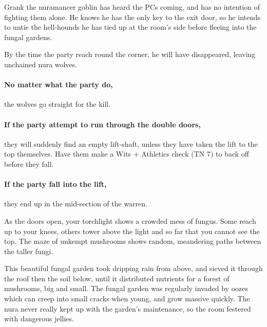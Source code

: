 \begin{multicols}{2}
Grank the nuramancer goblin has heard the PCs coming, and has no intention of fighting them alone.
He knows he has the only key to the exit door, so he intends to untie the hell-hounds he has tied up at the room's side before fleeing into the fungal gardens.

By the time the party reach round the corner, he will have disappeared, leaving unchained nura wolves.


\paragraph{No matter what the party do,}
the wolves go straight for the kill.

\paragraph{If the party attempt to run through the double doors,}
they will suddenly find an empty lift-shaft, unless they have taken the lift to the top themselves.
Have them make a Wits + Athletics check (TN 7) to back off before they fall.

\paragraph{If the party fall into the lift,}
they end up in the mid-section of the warren.



\begin{boxtext}

	As the doors open, your torchlight shows a crowded mess of fungus.
	Some reach up to your knees, others tower above the light and so far that you cannot see the top.
	The maze of unkempt mushrooms shows random, meandering paths between the taller fungi.

\end{boxtext}

\begin{exampletext}

	This beautiful fungal garden took dripping rain from above, and sieved it through the roof then the soil below, until it distributed nutrients for a forest of mushrooms, big and small.
	The fungal garden was regularly invaded by oozes which can creep into small cracks when young, and grow massive quickly.
	The nura never really kept up with the garden's maintenance, so the room festered with dangerous jellies.


\end{exampletext}
\end{multicols}
